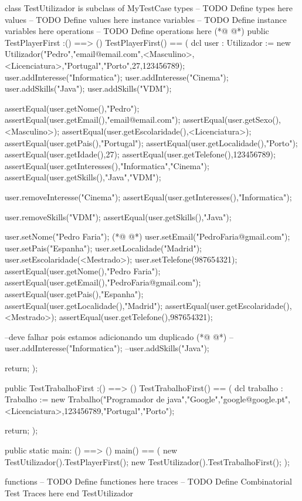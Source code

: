 \begin{vdmpp}[breaklines=true]
class TestUtilizador is subclass of MyTestCase
types
-- TODO Define types here
values
-- TODO Define values here
instance variables
-- TODO Define instance variables here
operations
-- TODO Define operations here
(*@
\label{TestPlayerFirst:10}
@*)
public TestPlayerFirst :() ==> ()
TestPlayerFirst() ==
(
 dcl user : Utilizador := new Utilizador("Pedro","email@email.com",<Masculino>,<Licenciatura>,"Portugal","Porto",27,123456789);
 user.addInteresse("Informatica");
 user.addInteresse("Cinema");
 user.addSkills("Java");
 user.addSkills("VDM");
 
 assertEqual(user.getNome(),"Pedro");
 assertEqual(user.getEmail(),"email@email.com");
 assertEqual(user.getSexo(),<Masculino>);
 assertEqual(user.getEscolaridade(),<Licenciatura>);
 assertEqual(user.getPais(),"Portugal");
 assertEqual(user.getLocalidade(),"Porto");
 assertEqual(user.getIdade(),27);
 assertEqual(user.getTelefone(),123456789);
 assertEqual(user.getInteresses(),{"Informatica","Cinema"});
 assertEqual(user.getSkills(),{"Java","VDM"});
 
 user.removeInteresse("Cinema");
 assertEqual(user.getInteresses(),{"Informatica"});
 
 user.removeSkills("VDM");
 assertEqual(user.getSkills(),{"Java"});
 
 user.setNome("Pedro Faria");
(*@
\label{main:37}
@*)
 user.setEmail("PedroFaria@gmail.com");
 user.setPais("Espanha");
 user.setLocalidade("Madrid");
 user.setEscolaridade(<Mestrado>);
 user.setTelefone(987654321);
 assertEqual(user.getNome(),"Pedro Faria");
 assertEqual(user.getEmail(),"PedroFaria@gmail.com");
 assertEqual(user.getPais(),"Espanha");
 assertEqual(user.getLocalidade(),"Madrid");
 assertEqual(user.getEscolaridade(),<Mestrado>);
 assertEqual(user.getTelefone(),987654321);
 
 --deve falhar pois estamos adicionando um duplicado
(*@
\label{TestTrabalhoFirst:50}
@*)
 --user.addInteresse("Informatica");
 --user.addSkills("Java");
 
 return;
);


public TestTrabalhoFirst :() ==> ()
TestTrabalhoFirst() ==
(
 dcl trabalho : Trabalho := new Trabalho("Programador de java","Google","google@google.pt",<Licenciatura>,123456789,"Portugal","Porto");
 
 return;
);

public static main: () ==> ()
main() ==
(
   new TestUtilizador().TestPlayerFirst();
   new TestUtilizador().TestTrabalhoFirst();
);

functions
-- TODO Define functiones here
traces
-- TODO Define Combinatorial Test Traces here
end TestUtilizador
\end{vdmpp}
